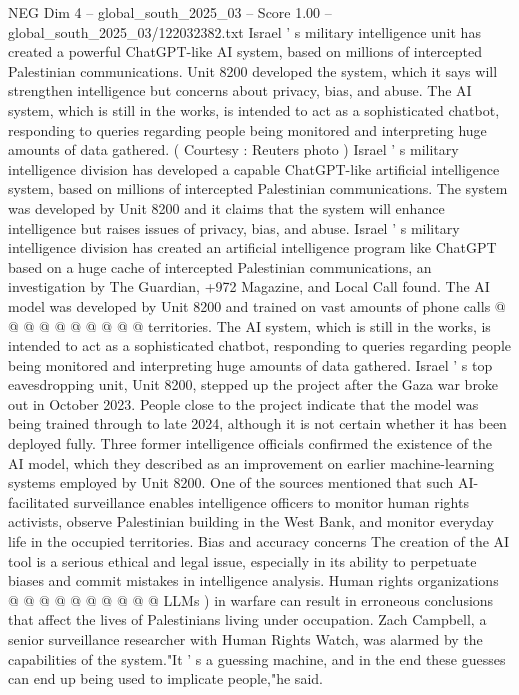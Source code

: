 \begin{textsample}{NEG Dim 4 – global\_south\_2025\_03 – Score 1.00 – global\_south\_2025\_03/122032382.txt}  \label{ex:f4_neg_421}
Israel ' s military intelligence unit has created a powerful ChatGPT-like AI system, based on millions of intercepted Palestinian communications.
Unit 8200 developed the system, which it says will strengthen intelligence but concerns about privacy, bias, and abuse.
The AI system, which is still in the works, is intended to act as a sophisticated chatbot, responding to queries regarding people being monitored and interpreting huge amounts of data gathered. ( Courtesy : Reuters photo ) Israel ' s military intelligence division has developed a capable ChatGPT-like artificial intelligence system, based on millions of intercepted Palestinian communications.
The system was developed by Unit 8200 and it claims that the system will enhance intelligence but raises issues of privacy, bias, and abuse.
Israel ' s military intelligence division has created an artificial intelligence program like ChatGPT based on a huge cache of intercepted Palestinian communications, an investigation by The Guardian, +972 Magazine, and Local Call found.
The AI model was developed by Unit 8200 and trained on vast amounts of phone calls @ @ @ @ @ @ @ @ @ @ territories.
The AI system, which is still in the works, is intended to act as a sophisticated chatbot, responding to queries regarding people being monitored and interpreting huge amounts of data gathered.
Israel ' s top eavesdropping unit, Unit 8200, stepped up the project after the Gaza war broke out in October 2023.
People close to the project indicate that the model was being trained through to late 2024, although it is not certain whether it has been deployed fully.
Three former intelligence officials confirmed the existence of the AI model, which they described as an improvement on earlier machine-learning systems employed by Unit 8200.
One of the sources mentioned that such AI-facilitated surveillance enables intelligence officers to monitor human rights activists, observe Palestinian building in the West Bank, and monitor everyday life in the occupied territories.
Bias and accuracy concerns The creation of the AI tool is a serious ethical and legal issue, especially in its ability to perpetuate biases and commit mistakes in intelligence analysis.
Human rights organizations @ @ @ @ @ @ @ @ @ @ LLMs ) in warfare can result in erroneous conclusions that affect the lives of Palestinians living under occupation.
Zach Campbell, a senior surveillance researcher with Human Rights Watch, was alarmed by the capabilities of the system."It ' s a guessing machine, and in the end these guesses can end up being used to implicate people,"he said.

\end{textsample}

